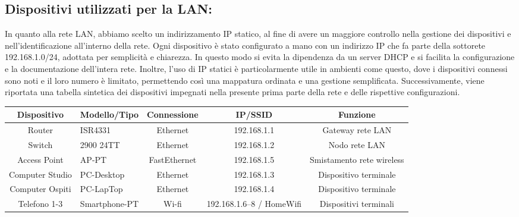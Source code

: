 \documentclass[italian, 12pt, a4paper]{article}
\begin{document}
\subsection{Dispositivi utilizzati per la  LAN:}\label{sec:lan}
In quanto alla rete LAN, abbiamo scelto un indirizzamento IP statico, al fine di avere un maggiore controllo nella gestione dei dispositivi e nell'identificazione all'interno della rete. Ogni dispositivo è stato configurato a mano con un indirizzo IP che fa parte della sottorete 192.168.1.0/24, adottata per semplicità e chiarezza. In questo modo si evita la dipendenza da un server DHCP e si facilita la configurazione e la documentazione dell'intera rete. Inoltre, l'uso di IP statici è particolarmente utile in ambienti come questo, dove i dispositivi connessi sono noti e il loro numero è limitato, permettendo così una mappatura ordinata e una gestione semplificata. Successivamente, viene riportata una tabella sintetica dei dispositivi impegnati nella presente prima parte della rete e delle rispettive configurazioni.
\begin{center}
    \renewcommand{\arraystretch}{1.5} %
    \begin{adjustbox}{max width=\textwidth} %
    \begin{tabular}{|c|p{3cm}|c|c|c|}
        \hline
        \rowcolor{violet!30}
        Dispositivo & Modello/Tipo & Connessione & IP/SSID & Funzione\\
        \hline
        Router & ISR4331 & Ethernet & 192.168.1.1 & Gateway rete LAN\\
        \hline
        Switch & 2900 24TT & Ethernet & 192.168.1.2 & Nodo rete LAN\\
        \hline
        Access Point & AP-PT & FastEthernet & 192.168.1.5 & Smistamento rete wireless\\
        \hline
        Computer Studio & PC-Desktop & Ethernet & 192.168.1.3 & Dispositivo terminale\\
        \hline
        Computer Ospiti & PC-LapTop & Ethernet & 192.168.1.4 & Dispositivo terminale\\
        \hline
        Telefono 1-3 & Smartphone-PT & Wi-fi & 192.168.1.6--8 / HomeWifi & Dispositivi terminali\\
        \hline
    \end{tabular}
    \end{adjustbox}\\[4mm]
\end{center}
\clearpage
\end{document}
